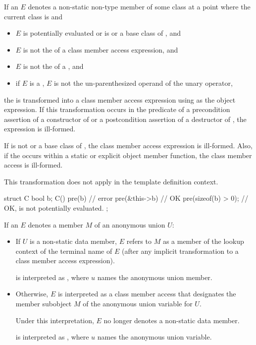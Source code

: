 \pnum
If an  $E$ denotes
a non-static non-type member of some class  at a point where
the current class is  and
\begin{itemize}
\item
$E$ is potentially evaluated or
 is  or a base class of , and
\item
$E$ is not the  of
a class member access expression, and
\item
$E$ is not the  of
a , and
\item
if $E$ is a ,
$E$ is not the un-parenthesized operand of
the unary \tcode{\&} operator,
\end{itemize}
the  is transformed into
a class member access expression using  as the object expression.
If this transformation occurs
in the predicate of a precondition assertion of a constructor of 
or a postcondition assertion of a destructor of ,
the expression is ill-formed.
\begin{note}
If  is not  or a base class of ,
the class member access expression is ill-formed.
Also, if the  occurs within
a static or explicit object member function,
the class member access is ill-formed.
\end{note}
This transformation does not apply in
the template definition context.
\begin{example}
\begin{codeblock}
struct C {
  bool b;
  C() pre(b)                // error
      pre(&this->b)         // OK
      pre(sizeof(b) > 0);   // OK,  is not potentially evaluated.
};
\end{codeblock}
\end{example}

\pnum
If an  $E$ denotes
a member $M$ of an anonymous union $U$:
\begin{itemize}
\item
If $U$ is a non-static data member,
$E$ refers to $M$ as a member of the lookup context of the terminal name of $E$
(after any implicit transformation to
a class member access expression).
\begin{example}
 is interpreted as ,
where $u$ names the anonymous union member.
\end{example}
\item
Otherwise, $E$ is interpreted as a class member access
that designates the member subobject $M$ of
the anonymous union variable for $U$.
\begin{note}
Under this interpretation, $E$ no longer denotes a non-static data member.
\end{note}
\begin{example}
 is interpreted as ,
where $u$ names the anonymous union variable.
\end{example}
\end{itemize}

